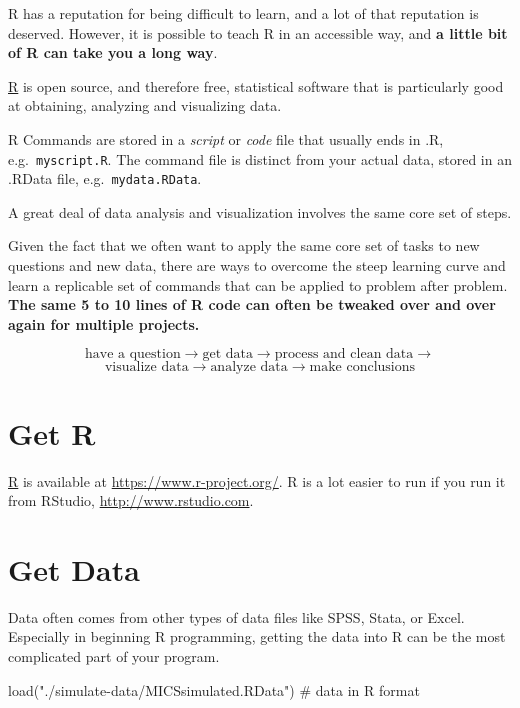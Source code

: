 \documentclass[
  letterpaper,
  DIV=11,
  numbers=noendperiod]{scrreprt}
\newenvironment{Shaded}{\begin{snugshade}}{\end{snugshade}}
\newcommand{\CommentTok}[1]{\textcolor[rgb]{0.37,0.37,0.37}{#1}}
\newcommand{\FunctionTok}[1]{\textcolor[rgb]{0.28,0.35,0.67}{#1}}
\newcommand{\NormalTok}[1]{\textcolor[rgb]{0.00,0.23,0.31}{#1}}
\newcommand{\StringTok}[1]{\textcolor[rgb]{0.13,0.47,0.30}{#1}}
\begin{document}
R has a reputation for being difficult to learn, and a lot of that
reputation is deserved. However, it is possible to teach R in an
accessible way, and \textbf{a little bit of R can take you a long way}.

\href{https://www.r-project.org/}{R} is open source, and therefore free,
statistical software that is particularly good at obtaining, analyzing
and visualizing data.

R Commands are stored in a \emph{script} or \emph{code} file that
usually ends in .R, e.g.~\texttt{myscript.R}. The command file is
distinct from your actual data, stored in an .RData file,
e.g.~\texttt{mydata.RData}.

A great deal of data analysis and visualization involves the same core
set of steps.

Given the fact that we often want to apply the same core set of tasks to
new questions and new data, there are ways to overcome the steep
learning curve and learn a replicable set of commands that can be
applied to problem after problem. \textbf{The same 5 to 10 lines of R
code can often be tweaked over and over again for multiple projects.}

\[\text{have a question} \rightarrow \text{get data} \rightarrow \text{process and clean data} \rightarrow\]
\[\text{visualize data} \rightarrow \text{analyze data} \rightarrow \text{make conclusions}\]

\hypertarget{get-r}{%
\section{Get R}\label{get-r}}

\href{https://www.r-project.org/}{R} is available at
\url{https://www.r-project.org/}. R is a lot easier to run if you run it
from RStudio, \url{http://www.rstudio.com}.

\hypertarget{get-data}{%
\section{Get Data}\label{get-data}}

Data often comes from other types of data files like SPSS, Stata, or
Excel. Especially in beginning R programming, getting the data into R
can be the most complicated part of your program.

\begin{Shaded}
\begin{Highlighting}[]
\FunctionTok{load}\NormalTok{(}\StringTok{"./simulate{-}data/MICSsimulated.RData"}\NormalTok{) }\CommentTok{\# data in R format}
\end{Highlighting}
\end{Shaded}
\end{document}
